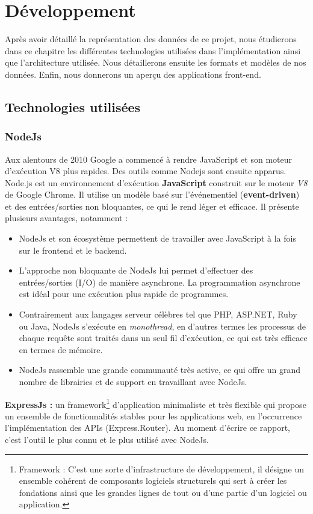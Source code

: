 \chapter{Développement}
Après avoir détaillé la représentation des données de ce projet, nous étudierons dans ce chapitre les différentes technologies utilisées dans l'implémentation ainsi que l'architecture utilisée. Nous détaillerons ensuite les formats et modèles de nos données. Enfin, nous donnerons un aperçu des applications front-end.
\section{Technologies utilisées}
\subsection{NodeJs}
Aux alentours de 2010 Google a commencé à rendre \Gls{JavaScript} et son moteur d'exécution V8 plus rapides. Des outils comme Nodejs sont ensuite apparus\cite{NodeJs}.\newline
Node.js est un environnement d'exécution \textbf{JavaScript} construit sur le moteur \emph{V8} de Google Chrome. Il utilise un modèle basé sur l'événementiel (\textbf{event-driven}) et des entrées/sorties non bloquantes, ce qui le rend léger et efficace.
Il présente plusieurs avantages, notamment :
\begin{itemize}
	\item NodeJs et son écosystème permettent de travailler avec JavaScript à la fois sur le frontend et le backend.
	\item L'approche non bloquante de NodeJs lui permet d'effectuer des entrées/sorties (I/O) de manière asynchrone. La programmation asynchrone est idéal pour une exécution plus rapide de programmes.
	\item Contrairement aux langages serveur célèbres tel que PHP, ASP.NET, Ruby ou Java, NodeJs s'exécute en \emph{monothread}, en d'autres termes les processus de chaque requête sont traités dans un seul fil d'exécution, ce qui est très efficace en termes de mémoire.
	\item NodeJs rassemble une grande communauté très active, ce qui offre un grand nombre de librairies et de support en travaillant avec NodeJs.\newline
\end{itemize}

\textbf{ExpressJs :} un framework\footnote{Framework : C'est une sorte d'infrastructure de développement, il désigne un ensemble cohérent de composants logiciels structurels qui sert à créer les fondations ainsi que les grandes lignes de tout ou d'une partie d'un logiciel ou application.} d'application minimaliste et très flexible qui propose un ensemble de fonctionnalités stables pour les applications web, en l'occurrence l'implémentation des APIs (Express.Router). Au moment d'écrire ce rapport, c'est l'outil le plus connu et le plus utilisé avec NodeJs.

